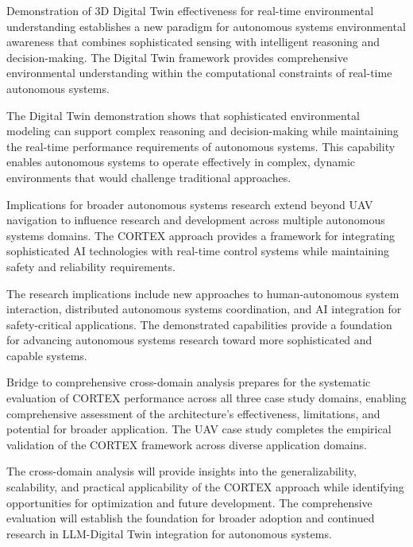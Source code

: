 Demonstration of 3D Digital Twin effectiveness for real-time environmental understanding establishes a new paradigm for autonomous systems environmental awareness that combines sophisticated sensing with intelligent reasoning and decision-making. The Digital Twin framework provides comprehensive environmental understanding within the computational constraints of real-time autonomous systems.

The Digital Twin demonstration shows that sophisticated environmental modeling can support complex reasoning and decision-making while maintaining the real-time performance requirements of autonomous systems. This capability enables autonomous systems to operate effectively in complex, dynamic environments that would challenge traditional approaches.

Implications for broader autonomous systems research extend beyond UAV navigation to influence research and development across multiple autonomous systems domains. The CORTEX approach provides a framework for integrating sophisticated AI technologies with real-time control systems while maintaining safety and reliability requirements.

The research implications include new approaches to human-autonomous system interaction, distributed autonomous systems coordination, and AI integration for safety-critical applications. The demonstrated capabilities provide a foundation for advancing autonomous systems research toward more sophisticated and capable systems.

Bridge to comprehensive cross-domain analysis prepares for the systematic evaluation of CORTEX performance across all three case study domains, enabling comprehensive assessment of the architecture's effectiveness, limitations, and potential for broader application. The UAV case study completes the empirical validation of the CORTEX framework across diverse application domains.

The cross-domain analysis will provide insights into the generalizability, scalability, and practical applicability of the CORTEX approach while identifying opportunities for optimization and future development. The comprehensive evaluation will establish the foundation for broader adoption and continued research in LLM-Digital Twin integration for autonomous systems.

